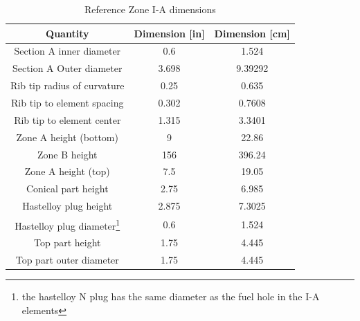 \begin{table}[htpb]
    \centering
    \caption{Reference Zone I-A dimensions}
    \label{tab:zone-ia-ref-specs}
    \begin{tabulary}{\linewidth}{|C|C|C|}
    \hline
    Quantity & Dimension [in] & Dimension [\unit{\centi\metre}]\\
    \hline
    Section A inner diameter & 0.6 & 1.524 \\
    \hline
    Section A Outer diameter & 3.698 & 9.39292 \\
    \hline
    Rib tip radius of curvature & 0.25 & 0.635 \\
    \hline
    Rib tip to element spacing & 0.302 & 0.7608 \\
    \hline
    Rib tip to element center & 1.315 & 3.3401 \\
    \hline
    Zone A height (bottom) & 9 & 22.86\\
    \hline
    Zone B height & 156 & 396.24 \\
    \hline
    Zone A height (top) & 7.5 & 19.05 \\
    \hline
    Conical part height & 2.75 & 6.985 \\
    \hline
    Hastelloy plug height & 2.875 & 7.3025 \\
    \hline
    Hastelloy plug diameter\footnote{the hastelloy N plug has the same diameter as the fuel hole in the I-A elements} & 0.6 & 1.524 \\
    \hline
    Top part height & 1.75 & 4.445 \\
    \hline
    Top part outer diameter & 1.75 & 4.445 \\
    \hline
    \end{tabulary}
\end{table}


